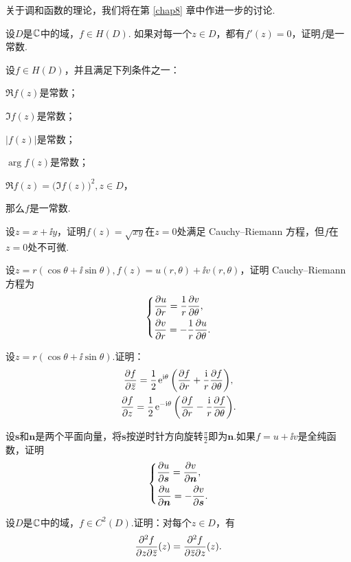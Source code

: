 关于调和函数的理论，我们将在第 \ref{chap8} 章中作进一步的讨论.
\begin{xiti}\hypertarget{xiti2.2}{}
  \item \hypertarget{xiti2.2.1}{}设$D$是$\mathbb C$中的域，$f\in H(D)$. 如果对每一个$z\in D$，都有$f'(z)=0$，证明$f$是一常数.
  \item 设$f\in H(D)$，并且满足下列条件之一：
    \begin{enuma}
      \item $\Re f(z)$是常数；
      \item $\Im f(z)$是常数；
      \item $|f(z)|$是常数；
      \item $\arg f(z)$是常数；
      \item $\Re f(z)=\big(\Im f(z)\big)^2,z\in D$，
    \end{enuma}
    那么$f$是一常数.
  \item 设$z=x+\ii y$，证明$f(z)=\sqrt{xy}$在$z=0$处满足 Cauchy--Riemann 方程，但$f$在$z=0$处不可微.
  \item \hypertarget{xiti2.2.4}{}设$z=r(\cos\theta+\ii\sin\theta),f(z)=u(r,\theta)+\ii v(r,\theta)$，证明 Cauchy--Riemann 方程为
      \[
        \left\{\begin{aligned}
               & \frac{\partial u}{\partial r} = \frac1r \frac{\partial v}{\partial \theta},\\
               & \frac{\partial v}{\partial r} = -\frac1r\frac{\partial u}{\partial \theta}.
        \end{aligned}\right.
      \]
  \item 设$z=r(\cos\theta+\ii\sin\theta)$.证明：
     \begin{gather*}
       \frac{\partial f}{\partial {}\mkern2mu\overline{\mkern-2muz}}=\frac12\operatorname{\!\!\;\mathrm e}^{\mathrm i\theta}\bigg(\frac{\partial f}{\partial r}+\frac{\mathrm i}r\frac{\partial f}{\partial \theta}\bigg),\\
       \frac{\partial f}{\partial z}=\frac12\operatorname{\!\!\;\mathrm e}^{-\mathrm i\theta}\bigg(\frac{\partial f}{\partial r}-\frac{\mathrm i}r\frac{\partial f}{\partial \theta}\bigg).
     \end{gather*}
  \item 设$\boldsymbol s$和$\boldsymbol n$是两个平面向量，将$\boldsymbol s$按逆时针方向旋转$\frac\pi2$即为$\boldsymbol n$.如果$f=u+\ii v$是全纯函数，证明
     \[
       \left\{\begin{aligned}
           & \frac{\partial u}{\partial \boldsymbol s} = \frac{\partial v}{\partial \boldsymbol n},\\
           & \frac{\partial u}{\partial \boldsymbol n} = -\frac{\partial v}{\partial \boldsymbol s}.
            \end{aligned}
       \right.
     \]
  \item 设$D$是$\mathbb C$中的域，$f\in C^2(D)$.证明：对每个$z\in D$，有
     \[
       \frac{\partial^2 f}{\partial z\partial {}\mkern2mu\overline{\mkern-2muz}}(z) = \frac{\partial^2 f}{\partial {}\mkern2mu\overline{\mkern-2muz}\partial z}(z).
\]
\end{xiti}
